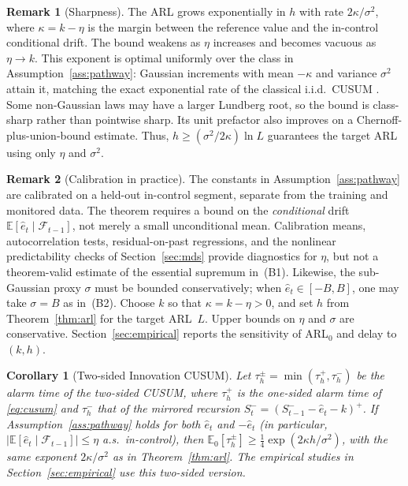 \documentclass[bj,authoryear]{imsart}
\theoremstyle{plain}
\newtheorem{corollary}[theorem]{Corollary}
\theoremstyle{definition}
\newtheorem{remark}{Remark}[section]
\newcommand{\E}{\mathbb{E}}
\newcommand{\F}{\mathcal{F}}
\newcommand{\given}{\mid}
\begin{document}
\begin{remark}[Sharpness]
The ARL grows exponentially in $h$ with rate $2\kappa/\sigma^2$, where
$\kappa=k-\eta$ is the margin between the reference value and the
in-control conditional drift.  The bound weakens as $\eta$ increases and
becomes vacuous as $\eta\to k$.  This exponent is optimal uniformly over
the class in Assumption~\ref{ass:pathway}: Gaussian increments with mean
$-\kappa$ and variance $\sigma^2$ attain it, matching the exact exponential
rate of the classical i.i.d.\ CUSUM
\citep{siegmund1985sequential,lorden1971procedures}.  Some non-Gaussian laws
may have a larger Lundberg root, so the bound is class-sharp rather than
pointwise sharp.  Its unit prefactor also improves on a
Chernoff-plus-union-bound estimate.  Thus,
$h\geq(\sigma^2/2\kappa)\ln L$ guarantees the target ARL using only
$\eta$ and $\sigma^2$.
\end{remark}


\begin{remark}[Calibration in practice]
\label{rem:calibration}
The constants in Assumption~\ref{ass:pathway} are calibrated on a held-out
in-control segment, separate from the training and monitored data.  The
theorem requires a bound on the \emph{conditional} drift
$\E[\hat e_t\given\F_{t-1}]$, not merely a small unconditional mean.
Calibration means, autocorrelation tests, residual-on-past regressions, and
the nonlinear predictability checks of Section~\ref{sec:mds} provide
diagnostics for $\eta$, but not a theorem-valid estimate of the essential
supremum in~(B1).  Likewise, the sub-Gaussian proxy $\sigma$ must be bounded
conservatively; when $\hat e_t\in[-B,B]$, one may take $\sigma=B$ as
in~(B2).  Choose $k$ so that $\kappa=k-\eta>0$, and set $h$ from
Theorem~\ref{thm:arl} for the target ARL~$L$.  Upper bounds on $\eta$ and
$\sigma$ are conservative.  Section~\ref{sec:empirical} reports the
sensitivity of ARL$_0$ and delay to $(k,h)$.
\end{remark}


\begin{corollary}[Two-sided Innovation CUSUM]
\label{cor:twosided}
  Let $\tau_h^{\pm} = \min(\tau_h^+, \tau_h^-)$ be the alarm time of the
  two-sided CUSUM, where $\tau_h^+$ is the one-sided alarm time of
  \eqref{eq:cusum} and $\tau_h^-$ that of the mirrored recursion
  $S_t^- = (S_{t-1}^- - \hat e_t - k)^+$.  If
  Assumption~\ref{ass:pathway} holds for both $\hat e_t$ and $-\hat e_t$
  (in particular, $|\E[\hat e_t\given\F_{t-1}]|\leq\eta$ a.s.\ in-control),
  then $\E_0[\tau_h^{\pm}]\geq\tfrac14\exp(2\kappa h/\sigma^2)$,
  with the same exponent $2\kappa/\sigma^2$ as in
  Theorem~\ref{thm:arl}.
  The empirical studies in Section~\ref{sec:empirical} use this two-sided
  version.
\end{corollary}
\end{document}
